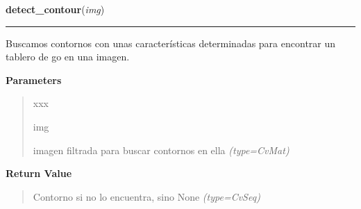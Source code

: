 \hspace{.8\funcindent}\begin{boxedminipage}{\funcwidth}

    \raggedright \textbf{detect\_contour}(\textit{img})

    \vspace{-1.5ex}

    \rule{\textwidth}{0.5\fboxrule}
\setlength{\parskip}{2ex}
Buscamos contornos con unas características determinadas para encontrar un tablero de go en una imagen.

\setlength{\parskip}{1ex}
      \textbf{Parameters}
      \vspace{-1ex}

      \begin{quote}
        \begin{Ventry}{xxx}

          \item[img]


imagen filtrada para buscar contornos en ella
            {\it (type=CvMat)}

        \end{Ventry}

      \end{quote}

      \textbf{Return Value}
    \vspace{-1ex}

      \begin{quote}

Contorno si no lo encuentra, sino None
      {\it (type=CvSeq)}

      \end{quote}

    \end{boxedminipage}

    \label{src:search_goban:search_goban}

    \vspace{0.5ex}

